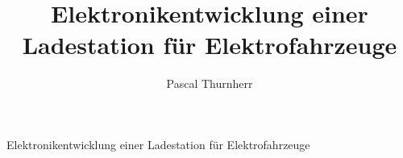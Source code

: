 \documentclass[11pt,a4paper,draft,titlepage]{book}
\author{Pascal Thurnherr}
\title{Elektronikentwicklung einer Ladestation für Elektrofahrzeuge}
\begin{document}
	\begin{center}
		Elektronikentwicklung einer Ladestation für Elektrofahrzeuge
	\end{center}
\end{document}
